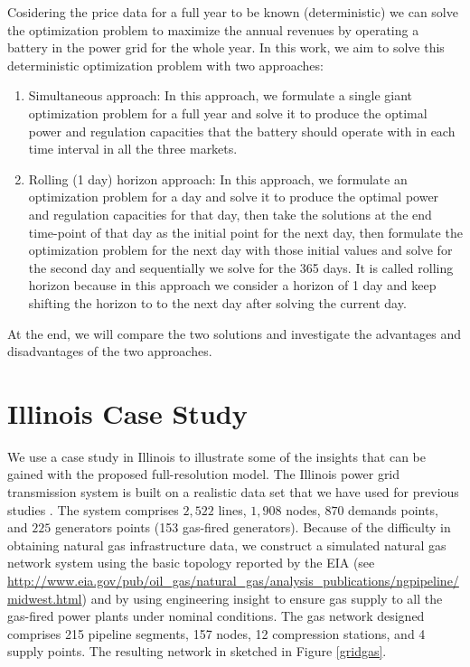 \documentclass[11pt,twoside]{article}
\begin{document}
Cosidering the price data for a full year to be known (deterministic) we can solve the optimization problem to maximize the annual revenues by operating a battery in the power grid for the whole year. In this work, we aim to solve this deterministic optimization problem with two approaches:
\begin{enumerate}
\item Simultaneous approach: In this approach, we formulate a single giant optimization problem for a full year and solve it to produce the optimal power and regulation capacities that the battery should operate with in each time interval in all the three markets. 
\item Rolling (1 day) horizon approach: In this approach, we formulate an optimization problem for a day and solve it to produce the optimal power and regulation capacities for that day, then take the solutions at the end time-point of that day as the initial point for the next day, then formulate the optimization problem for the next day with those initial values and solve for the second day and sequentially we solve for the 365 days. It is called rolling horizon because in this approach we consider a horizon of 1 day and keep shifting the horizon to to the next day after solving the current day.
\end{enumerate}

At the end, we will compare the two solutions and investigate the advantages and disadvantages of the two approaches.

\section{Illinois Case Study}\label{sec:case}

We use a case study in Illinois to illustrate some of the insights that can be gained with the proposed full-resolution model. The Illinois power grid transmission system  is built on a realistic data set that we have used for previous studies \cite{zavaladispatch}. The system comprises $2{,}522$ lines, $1{,}908$ nodes, $870$ demands points, and $225$ generators points (153 gas-fired generators). Because of the difficulty in obtaining natural gas infrastructure data, we construct a simulated natural gas network system using the basic topology reported by the EIA (see \url{http://www.eia.gov/pub/oil_gas/natural_gas/analysis_publications/ngpipeline/midwest.html}) and by using engineering insight to ensure gas supply to all the gas-fired power plants under nominal conditions. The gas network designed comprises 215 pipeline segments, 157 nodes, 12 compression stations, and 4 supply points. The resulting network in sketched in Figure \ref{gridgas}. 
\end{document}
